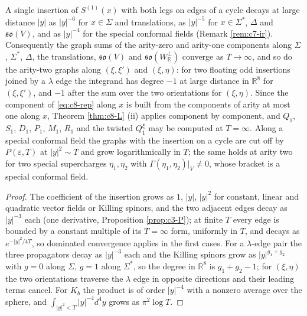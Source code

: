 \begin{proposition}
\label{prop:c8-Tsafe}
A single insertion of $S^{(1)}(x)$ with both legs on edges of a cycle decays at large distance $|y|$ as $|y|^{-6}$ for $x\in\Sigma$ and translations, as $|y|^{-5}$ for $x\in\Sigma^*$, $\Delta$ and $\mathfrak{so}(V)$, and as $|y|^{-4}$ for the special conformal fields (Remark \ref{rem:c7-ir}). Consequently the graph sums of the arity-zero and arity-one components along $\Sigma$, $\Sigma^*$, $\Delta$, the translations, $\mathfrak{so}(V)$ and $\mathfrak{so}(W_{\mathbb R}^\perp)$ converge as $T\to\infty$, and so do the arity-two graphs along $(\xi,\xi')$ and $(\xi,\eta)$: for two floating odd insertions joined by a $\lambda$ edge the integrand has degree $-1$ at large distance in $\mathbb R^8$ for $(\xi,\xi')$, and $-1$ after the sum over the two orientations for $(\xi,\eta)$. Since the component of \eqref{eq:c8-rep} along $x$ is built from the components of arity at most one along $x$, Theorem \ref{thm:c8-L} (ii) applies component by component, and $Q_1$, $S_1$, $D_1$, $P_1$, $M_1$, $R_1$ and the twisted $Q^\xi_1$ may be computed at $T=\infty$. Along a special conformal field the graphs with the insertion on a cycle are cut off by $P(\varepsilon,T)$ at $|y|^2\sim T$ and grow logarithmically in $T$; the same holds at arity two for two special supercharges $\eta_1,\eta_2$ with $\Gamma(\eta_1,\eta_2)|_V\neq0$, whose bracket is a special conformal field.
\end{proposition}

\begin{proof}
The coefficient of the insertion grows as $1$, $|y|$, $|y|^2$ for constant, linear and quadratic vector fields or Killing spinors, and the two adjacent edges decay as $|y|^{-3}$ each (one derivative, Proposition \ref{prop:c3-P}); at finite $T$ every edge is bounded by a constant multiple of its $T=\infty$ form, uniformly in $T$, and decays as $e^{-|y|^2/4T}$, so dominated convergence applies in the first cases. For a $\lambda$-edge pair the three propagators decay as $|y|^{-3}$ each and the Killing spinors grow as $|y|^{g_1+g_2}$ with $g=0$ along $\Sigma$, $g=1$ along $\Sigma^*$, so the degree in $\mathbb R^8$ is $g_1+g_2-1$; for $(\xi,\eta)$ the two orientations traverse the $\lambda$ edge in opposite directions and their leading terms cancel. For $K_b$ the product is of order $|y|^{-4}$ with a nonzero average over the sphere, and $\int_{|y|^2<T}|y|^{-4}d^4y$ grows as $\pi^2\log T$.
\end{proof}

